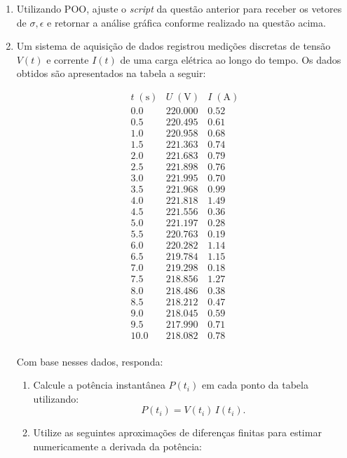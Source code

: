 \begin{enumerate}[label=\thesection.\arabic*]
\item Utilizando POO, ajuste o \textit{script} da questão anterior para receber os vetores de $\sigma, \epsilon$ e
retornar a análise gráfica conforme realizado na questão acima.


\item Um sistema de aquisição de dados registrou medições discretas de tensão $V(t)$ e corrente $I(t)$ de 
uma carga elétrica ao longo do tempo. Os dados obtidos são apresentados na tabela a seguir:

\[
\begin{array}{c|c|c}
t \; (\text{s}) & U \; (\text{V}) & I \; (\text{A}) \\
\hline
0.0 & 220.000 & 0.52 \\
0.5 & 220.495 & 0.61 \\
1.0 & 220.958 & 0.68 \\
1.5 & 221.363 & 0.74 \\
2.0 & 221.683 & 0.79 \\
2.5 & 221.898 & 0.76 \\
3.0 & 221.995 & 0.70 \\
3.5 & 221.968 & 0.99 \\
4.0 & 221.818 & 1.49 \\
4.5 & 221.556 & 0.36 \\
5.0 & 221.197 & 0.28 \\
5.5 & 220.763 & 0.19 \\
6.0 & 220.282 & 1.14 \\
6.5 & 219.784 & 1.15 \\
7.0 & 219.298 & 0.18 \\
7.5 & 218.856 & 1.27 \\
8.0 & 218.486 & 0.38 \\
8.5 & 218.212 & 0.47 \\
9.0 & 218.045 & 0.59 \\
9.5 & 217.990 & 0.71 \\
10.0 & 218.082 & 0.78 \\
\end{array}
\]

Com base nesses dados, responda:

\begin{enumerate}

\item Calcule a potência instantânea $P(t_i)$ em cada ponto da tabela utilizando:
\[
P(t_i) = V(t_i)\,I(t_i).
\]

\item Utilize as seguintes aproximações de diferenças finitas para estimar numericamente a derivada da potência:


\end{enumerate}
\end{enumerate}
